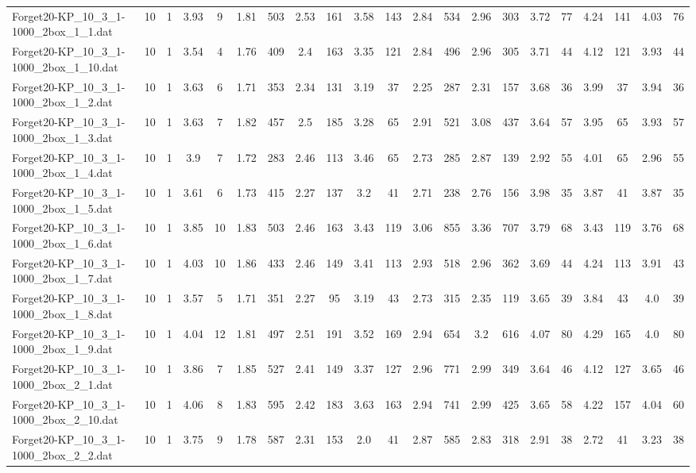 \begin{sidewaystable}[!ht]
{\begin{tabular}{lcccccccccccccccccccc}
Forget20-KP\_10\_3\_1-1000\_2box\_1\_1.dat & 10 & 1 & 3.93 & 9 & 1.81 & 503 & 2.53 & 161 & 3.58 & 143 & 2.84 & 534 & 2.96 & 303 & 3.72 & 77 & 4.24 & 141 & 4.03 & 76 \\
Forget20-KP\_10\_3\_1-1000\_2box\_1\_10.dat & 10 & 1 & 3.54 & 4 & 1.76 & 409 & 2.4 & 163 & 3.35 & 121 & 2.84 & 496 & 2.96 & 305 & 3.71 & 44 & 4.12 & 121 & 3.93 & 44 \\
Forget20-KP\_10\_3\_1-1000\_2box\_1\_2.dat & 10 & 1 & 3.63 & 6 & 1.71 & 353 & 2.34 & 131 & 3.19 & 37 & 2.25 & 287 & 2.31 & 157 & 3.68 & 36 & 3.99 & 37 & 3.94 & 36 \\
Forget20-KP\_10\_3\_1-1000\_2box\_1\_3.dat & 10 & 1 & 3.63 & 7 & 1.82 & 457 & 2.5 & 185 & 3.28 & 65 & 2.91 & 521 & 3.08 & 437 & 3.64 & 57 & 3.95 & 65 & 3.93 & 57 \\
Forget20-KP\_10\_3\_1-1000\_2box\_1\_4.dat & 10 & 1 & 3.9 & 7 & 1.72 & 283 & 2.46 & 113 & 3.46 & 65 & 2.73 & 285 & 2.87 & 139 & 2.92 & 55 & 4.01 & 65 & 2.96 & 55 \\
Forget20-KP\_10\_3\_1-1000\_2box\_1\_5.dat & 10 & 1 & 3.61 & 6 & 1.73 & 415 & 2.27 & 137 & 3.2 & 41 & 2.71 & 238 & 2.76 & 156 & 3.98 & 35 & 3.87 & 41 & 3.87 & 35 \\
Forget20-KP\_10\_3\_1-1000\_2box\_1\_6.dat & 10 & 1 & 3.85 & 10 & 1.83 & 503 & 2.46 & 163 & 3.43 & 119 & 3.06 & 855 & 3.36 & 707 & 3.79 & 68 & 3.43 & 119 & 3.76 & 68 \\
Forget20-KP\_10\_3\_1-1000\_2box\_1\_7.dat & 10 & 1 & 4.03 & 10 & 1.86 & 433 & 2.46 & 149 & 3.41 & 113 & 2.93 & 518 & 2.96 & 362 & 3.69 & 44 & 4.24 & 113 & 3.91 & 43 \\
Forget20-KP\_10\_3\_1-1000\_2box\_1\_8.dat & 10 & 1 & 3.57 & 5 & 1.71 & 351 & 2.27 & 95 & 3.19 & 43 & 2.73 & 315 & 2.35 & 119 & 3.65 & 39 & 3.84 & 43 & 4.0 & 39 \\
Forget20-KP\_10\_3\_1-1000\_2box\_1\_9.dat & 10 & 1 & 4.04 & 12 & 1.81 & 497 & 2.51 & 191 & 3.52 & 169 & 2.94 & 654 & 3.2 & 616 & 4.07 & 80 & 4.29 & 165 & 4.0 & 80 \\
Forget20-KP\_10\_3\_1-1000\_2box\_2\_1.dat & 10 & 1 & 3.86 & 7 & 1.85 & 527 & 2.41 & 149 & 3.37 & 127 & 2.96 & 771 & 2.99 & 349 & 3.64 & 46 & 4.12 & 127 & 3.65 & 46 \\
Forget20-KP\_10\_3\_1-1000\_2box\_2\_10.dat & 10 & 1 & 4.06 & 8 & 1.83 & 595 & 2.42 & 183 & 3.63 & 163 & 2.94 & 741 & 2.99 & 425 & 3.65 & 58 & 4.22 & 157 & 4.04 & 60 \\
Forget20-KP\_10\_3\_1-1000\_2box\_2\_2.dat & 10 & 1 & 3.75 & 9 & 1.78 & 587 & 2.31 & 153 & 2.0 & 41 & 2.87 & 585 & 2.83 & 318 & 2.91 & 38 & 2.72 & 41 & 3.23 & 38 \\

\end{tabular}}
\end{sidewaystable}
